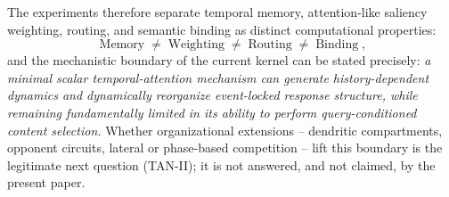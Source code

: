 The experiments therefore separate temporal memory, attention-like
saliency weighting, routing, and semantic binding as distinct
computational properties:
\begin{equation*}
  \boxed{\;
  \text{Memory} \;\neq\; \text{Weighting} \;\neq\;
  \text{Routing} \;\neq\; \text{Binding}
  \;},
\end{equation*}
and the mechanistic boundary of the current kernel can be stated
precisely: \emph{a minimal scalar temporal-attention mechanism can
generate history-dependent dynamics and dynamically reorganize
event-locked response structure, while remaining fundamentally limited
in its ability to perform query-conditioned content selection.}
Whether organizational extensions -- dendritic compartments,
opponent circuits, lateral or phase-based competition -- lift this
boundary is the legitimate next question (TAN-II); it is not answered,
and not claimed, by the present paper.
